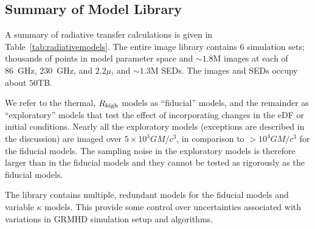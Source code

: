 \subsection{Summary of \sgra Model Library}


A summary of radiative transfer calculations is given in Table~\ref{tab:radiativemodels}. The entire image library contains $6$ simulation sets; thousands of points in model parameter space and $\sim 1.8$M images at each of 86~GHz, 230~GHz, and $2.2\mu$, and $\sim1.3$M SEDs.  The images and SEDs occupy about $50$TB.

We refer to the thermal, $R_\mathrm{high}$ models as ``fiducial'' models, and the remainder as ``exploratory'' models that test the effect of incorporating changes in the eDF or initial conditions.  Nearly all the exploratory models (exceptions are described in the discussion) are imaged over $5 \times 10^3 G M/c^3$, in comparison to $> 10^4 G M/c^3$ for the fiducial models. The sampling noise in the exploratory models is therefore larger than in the fiducial models and they cannot be tested as rigorously as the fiducial models.

The library contains multiple, redundant models for the fiducial models and variable $\kappa$ models.  This provide some control over uncertainties associated with variations in GRMHD simulation setup and algorithms.

